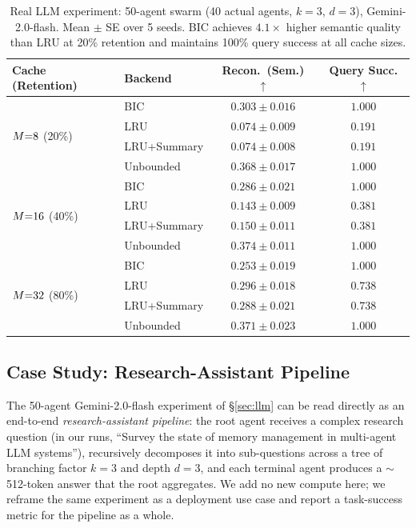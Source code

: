 \begin{table}[t]
\centering
\caption{Real LLM experiment: 50-agent swarm (40 actual agents,
  $k{=}3$, $d{=}3$), Gemini-2.0-flash.  Mean $\pm$ SE over 5 seeds.
  BIC achieves $4.1\times$ higher semantic quality than LRU at 20\%
  retention and maintains 100\% query success at all cache sizes.}
\label{tab:llm}
\vspace{0.3em}
\begin{tabular}{llcc}
\toprule
\textbf{Cache (Retention)} & \textbf{Backend} &
\textbf{Recon.\ (Sem.)} $\uparrow$ & \textbf{Query Succ.} $\uparrow$ \\
\midrule
\multirow{4}{*}{$M{=}8$ (20\%)}
  & BIC         & $\mathbf{0.303 \pm 0.016}$ & $\mathbf{1.000}$ \\
  & LRU         & $0.074 \pm 0.009$ & $0.191$ \\
  & LRU+Summary & $0.074 \pm 0.008$ & $0.191$ \\
  & Unbounded   & $0.368 \pm 0.017$ & $1.000$ \\
\midrule
\multirow{4}{*}{$M{=}16$ (40\%)}
  & BIC         & $\mathbf{0.286 \pm 0.021}$ & $\mathbf{1.000}$ \\
  & LRU         & $0.143 \pm 0.009$ & $0.381$ \\
  & LRU+Summary & $0.150 \pm 0.011$ & $0.381$ \\
  & Unbounded   & $0.374 \pm 0.011$ & $1.000$ \\
\midrule
\multirow{4}{*}{$M{=}32$ (80\%)}
  & BIC         & $0.253 \pm 0.019$ & $\mathbf{1.000}$ \\
  & LRU         & $\mathbf{0.296 \pm 0.018}$ & $0.738$ \\
  & LRU+Summary & $0.288 \pm 0.021$ & $0.738$ \\
  & Unbounded   & $0.371 \pm 0.023$ & $1.000$ \\
\bottomrule
\end{tabular}
\end{table}


\subsection{Case Study: Research-Assistant Pipeline}
\label{sec:case-study}

The 50-agent Gemini-2.0-flash experiment of \S\ref{sec:llm} can be
read directly as an end-to-end \emph{research-assistant pipeline}:
the root agent receives a complex research question (in our runs,
``Survey the state of memory management in multi-agent LLM systems''),
recursively decomposes it into sub-questions across a tree of branching
factor $k{=}3$ and depth $d{=}3$, and each terminal agent produces a
$\sim$512-token answer that the root aggregates.  We add no new
compute here; we reframe the same experiment as a deployment use case
and report a task-success metric for the pipeline as a whole.

